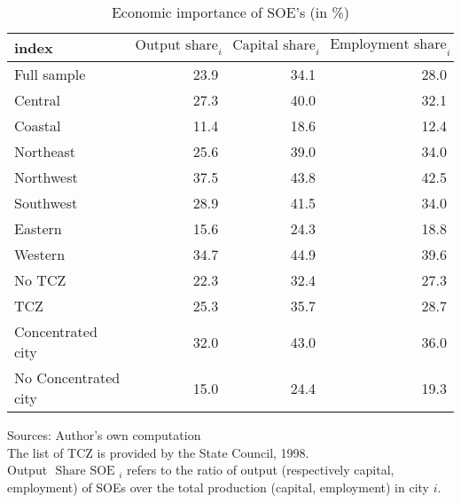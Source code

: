\documentclass[12pt]{article}
\begin{document}
\begin{table}[!htb] \centering
\caption{\\ Economic importance of SOE's (in \%)}
\label{table_2}
\begin{adjustbox}{width=\textwidth, totalheight=\baselineskip,keepaspectratio}
\begin{tabular}{lrrr}
\toprule
index & $\text{Output share SOE}_i$ & $\text{Capital share SOE}_i$ & $\text{Employment share SOE}_i$ \\
\midrule
Full sample          &             23.9 &              34.1 &                 28.0 \\
Central              &             27.3 &              40.0 &                 32.1 \\
Coastal              &             11.4 &              18.6 &                 12.4 \\
Northeast            &             25.6 &              39.0 &                 34.0 \\
Northwest            &             37.5 &              43.8 &                 42.5 \\
Southwest            &             28.9 &              41.5 &                 34.0 \\
Eastern              &             15.6 &              24.3 &                 18.8 \\
Western              &             34.7 &              44.9 &                 39.6 \\
No TCZ               &             22.3 &              32.4 &                 27.3 \\
TCZ                  &             25.3 &              35.7 &                 28.7 \\
Concentrated city    &             32.0 &              43.0 &                 36.0 \\
No Concentrated city &             15.0 &              24.4 &                 19.3 \\
\bottomrule
\end{tabular}
\end{adjustbox}
\begin{tablenotes} 
 \small 
 \item  
Sources: Author's own computation \\
The list of TCZ is provided by the State Council, 1998. \\
Output $\text { Share SOE }_{i}$ refers to the ratio of output (respectively capital, employment) of SOEs over the total production (capital, employment) in city $i$.
 \end{tablenotes}
\end{table}
\end{document}

